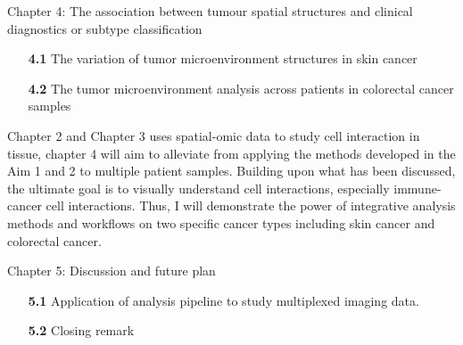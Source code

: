 Chapter 4: The association between tumour spatial structures and clinical diagnostics or subtype classification
\begin{enumerate}[align=left]
    \item[\textbf{4.1}] The variation of tumor microenvironment structures in skin cancer
    \item[\textbf{4.2}] The tumor microenvironment analysis across patients in colorectal cancer samples
\end{enumerate}
Chapter 2 and Chapter 3 uses spatial-omic data to study cell interaction in tissue, chapter 4 will aim to alleviate from applying the methods developed in the Aim 1 and 2 to multiple patient samples. Building upon what has been discussed, the ultimate goal is to visually understand cell interactions, especially immune-cancer cell interactions. Thus, I will demonstrate the power of integrative analysis methods and workflows on two specific cancer types including skin cancer and colorectal cancer.

Chapter 5: Discussion and future plan
\begin{enumerate}[align=left]
    \item[\textbf{5.1}] Application of analysis pipeline to study multiplexed imaging data.
    \item[\textbf{5.2}] Closing remark
\end{enumerate}

% 
% 
